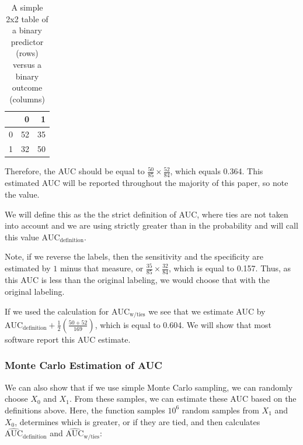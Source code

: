 \documentclass[article]{jss}
\begin{document}
\begin{CodeChunk}
\begin{table}[ht]

\caption{\label{tab:create_tab}A simple 2x2 table of a binary predictor (rows) versus a binary outcome (columns)}
\centering
\begin{tabular}{l|r|r}
\hline
  & 0 & 1\\
\hline
0 & 52 & 35\\
\hline
1 & 32 & 50\\
\hline
\end{tabular}
\end{table}

\end{CodeChunk}

Therefore, the AUC should be equal to
\(\frac{50}{85} \times \frac{52}{84}\), which equals 0.364. This
estimated AUC will be reported throughout the majority of this paper, so
note the value.

We will define this as the the strict definition of AUC, where ties are
not taken into account and we are using strictly greater than in the
probability and will call this value \(\text{AUC}_{\text{definition}}\).

Note, if we reverse the labels, then the sensitivity and the specificity
are estimated by \(1\) minus that measure, or
\(\frac{35}{85} \times \frac{32}{84}\), which is equal to 0.157. Thus,
as this AUC is less than the original labeling, we would choose that
with the original labeling.

If we used the calculation for \(\text{AUC}_{\text{w/ties}}\) we see
that we estimate AUC by
\(\text{AUC}_{\text{definition}} + \frac{1}{2}\left( \frac{50 + 52}{169}\right)\),
which is equal to 0.604. We will show that most software report this AUC
estimate.

\hypertarget{monte-carlo-estimation-of-auc}{%
\subsubsection{Monte Carlo Estimation of
AUC}\label{monte-carlo-estimation-of-auc}}

We can also show that if we use simple Monte Carlo sampling, we can
randomly choose \(X_{0}\) and \(X_{1}\). From these samples, we can
estimate these AUC based on the definitions above. Here, the function
 samples \(10^{6}\) random samples from \(X_{1}\) and
\(X_{0}\), determines which is greater, or if they are tied, and then
calculates \(\widehat{\text{AUC}}_{\text{definition}}\) and
\(\widehat{\text{AUC}}_{\text{w/ties}}\):
\end{document}

